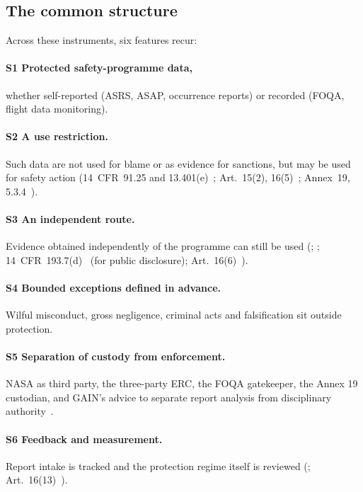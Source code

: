 \documentclass[11pt]{article}
\begin{document}
\subsection{The common structure}\label{sec:common}

Across these instruments, six features recur:

\paragraph{S1 Protected safety-programme data,} whether self-reported (ASRS, ASAP, occurrence reports) or recorded (FOQA, flight data monitoring).

\paragraph{S2 A use restriction.} Such data are not used for blame or as evidence for sanctions, but may be used for safety action (14~CFR~91.25 and 13.401(e)~\cite{cfr9125,cfr13401}; Art.~15(2), 16(5)~\cite{eu376}; Annex~19, 5.3.4~\cite{icao2016}).

\paragraph{S3 An independent route.} Evidence obtained independently of the programme can still be used (\cite[para.~8.3]{faa2021}; \cite[para.~16.4]{faa2020}; 14~CFR~193.7(d)~\cite{cfr1937} (for public disclosure); Art.~16(6)~\cite{eu376}).

\paragraph{S4 Bounded exceptions defined in advance.} Wilful misconduct, gross negligence, criminal acts and falsification sit outside protection.

\paragraph{S5 Separation of custody from enforcement.} NASA as third party, the three-party ERC, the FOQA gatekeeper, the Annex 19 custodian, and GAIN's advice to separate report analysis from disciplinary authority~\cite[Sec.~3.3]{gain2004}.

\paragraph{S6 Feedback and measurement.} Report intake is tracked and the protection regime itself is reviewed (\cite{nasaasrs}; Art.~16(13)~\cite{eu376}).
\end{document}
